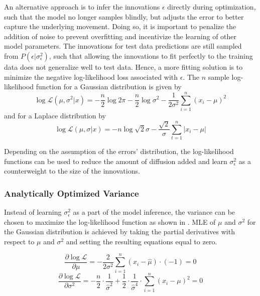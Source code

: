         An alternative approach is to infer the innovations $\epsilon$ directly during optimization, such that the model no longer samples blindly, but adjusts the error to better capture the underlying movement. 
        Doing so, it is important to penalize the addition of noise to prevent overfitting and incentivize the learning of other model parameters. The innovations for test data predictions are still sampled from $P(\epsilon|\sigma_\epsilon^2)$, such that allowing the innovations to fit perfectly to the training data does not generalize well to test data. Hence, a more fitting solution is to minimize the negative log-likelihood loss associated with $\epsilon$. The $n$ sample log-likelihood function for a Gaussian distribution is given by
        \begin{equation}\label{error-gaussian-log-loss}
            \log\mathcal{L}(\mu, \sigma^2\vert x) = -\frac{n}{2}\log2\pi - \frac{n}{2}\log\sigma^2 - \frac{1}{2\sigma^2}\sum_{i=1}^n (x_i - \mu)^2
        \end{equation}
        and for a Laplace distribution by
        \begin{equation}\label{error-laplace-log-loss}
            \log\mathcal{L}(\mu,\sigma\vert x)=-n\log\sqrt{2}\sigma -\frac{\sqrt{2}}{\sigma}\sum_{t=1}^n |x_i-\mu|
        \end{equation}
    
        Depending on the assumption of the errors' distribution, the log-likelihood functions can be used to reduce the amount of diffusion added and learn $\sigma_\epsilon^2$ as a counterweight to the size of the innovations.
        
    \subsubsection{Analytically Optimized Variance}
        
        Instead of learning $\sigma_\epsilon^2$ as a part of the model inference, the variance can be chosen to maximize the log-likelihood function as shown in \cite{haerdle2015statistics}. MLE of $\mu$ and $\sigma^2$ for the Gaussian distribution is achieved by taking the partial derivatives with respect to $\mu$ and $\sigma^2$ and setting the resulting equations equal to zero.
        
        \begin{equation}\label{error-mu-partial}
            \frac{\partial\log\mathcal{L}}{\partial\mu} = -\frac{2}{2\sigma^2}\sum_{i=1}^n(x_i-\hat{\mu})\cdot(-1) = 0
        \end{equation}
        \begin{equation}\label{error-sigma-partial}
            \frac{\partial\log\mathcal{L}}{\partial\sigma^2} = -\frac{n}{2}\cdot\frac{1}{\hat{\sigma}^2}+\frac{1}{2}\cdot\frac{1}{\hat{\sigma}^4}\cdot\sum_{i=1}^n(x_i-\mu)^2 = 0
        \end{equation}
        
